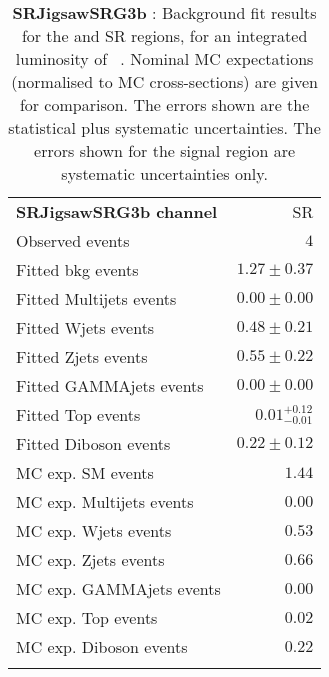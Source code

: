 

\begin{table}
\begin{center}
\setlength{\tabcolsep}{0.0pc}
{\tiny
\begin{tabular*}{\textwidth}{@{\extracolsep{\fill}}lr}
\noalign{\smallskip}\hline\noalign{\smallskip}
{\bf SRJigsawSRG3b channel}           & SR              \\[-0.05cm]
\noalign{\smallskip}\hline\noalign{\smallskip}
Observed events          & $4$                    \\
\noalign{\smallskip}\hline\noalign{\smallskip}
Fitted bkg events         & $1.27 \pm 0.37$              \\
\noalign{\smallskip}\hline\noalign{\smallskip}
        Fitted Multijets events         & $0.00 \pm 0.00$              \\
        Fitted Wjets events         & $0.48 \pm 0.21$              \\
        Fitted Zjets events         & $0.55 \pm 0.22$              \\
        Fitted GAMMAjets events         & $0.00 \pm 0.00$              \\
        Fitted Top events         & $0.01_{-0.01}^{+0.12}$              \\
        Fitted Diboson events         & $0.22 \pm 0.12$              \\
 \noalign{\smallskip}\hline\noalign{\smallskip}
MC exp. SM events              & $1.44$              \\
\noalign{\smallskip}\hline\noalign{\smallskip}
        MC exp. Multijets events         & $0.00$              \\
        MC exp. Wjets events         & $0.53$              \\
        MC exp. Zjets events         & $0.66$              \\
        MC exp. GAMMAjets events         & $0.00$              \\
        MC exp. Top events         & $0.02$              \\
        MC exp. Diboson events         & $0.22$              \\
\noalign{\smallskip}\hline\noalign{\smallskip}
\end{tabular*}
}
\end{center}
\caption{{\bf SRJigsawSRG3b} : Background fit results for the  and SR regions, for an integrated luminosity of \ourintlumi~\ifb. Nominal MC expectations (normalised to MC cross-sections) are given for comparison. The errors shown are the statistical plus systematic uncertainties. The errors shown for the signal region are systematic uncertainties only.}
\label{table.results.systematics.in.logL.fit.SR.SRJigsawSRG3b}
\end{table}
%